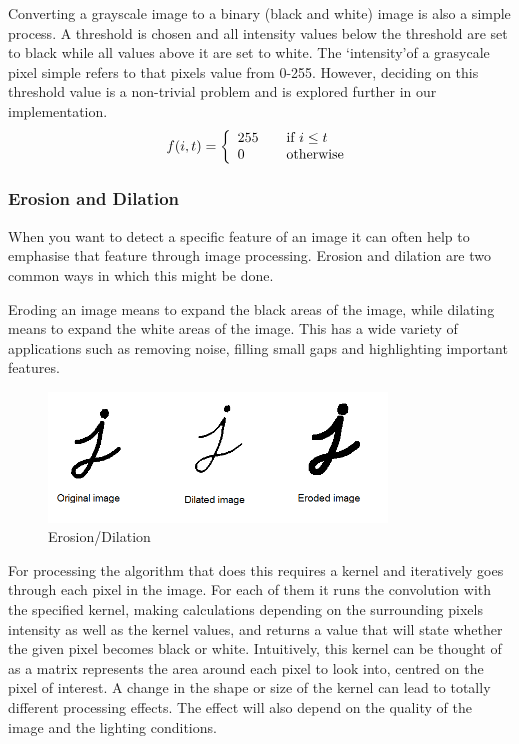 Converting a grayscale image to a binary (black and white) image is also a simple process. A threshold is chosen and all intensity values below the threshold are set to black while all values above it are set to white. The \lq intensity\rq of a grasycale pixel simple refers to that pixels value from 0-255. However, deciding on this threshold value is a non-trivial problem and is explored further in our implementation.   
\[ f(i,t) = \left\{ 
  \begin{array}{l l}
    255 & \quad \text{if } i \leq  t\\
    0   & \quad \text{otherwise}
  \end{array} \right.\]

        \subsubsection{Erosion and Dilation}

When you want to detect a specific feature of an image it can often help to emphasise that feature through image processing. Erosion and dilation are two common ways in which this might be done.

Eroding an image means to expand the black areas of the image, while dilating means to expand the white areas of the image. This has a wide variety of applications such as removing noise, filling small gaps and highlighting important features.
            \begin{figure}[ht!]
                \centering
                \includegraphics[width=90mm]{./assets/dilated.png}
                \caption{Erosion/Dilation}
                \label{image:dilationerosion}
            \end{figure}

For processing the algorithm that does this requires a kernel and iteratively goes through each pixel in the image. For each of them it runs the convolution with the specified kernel, making calculations depending on the surrounding pixels intensity as well as the kernel values, and returns a value that will state whether the given pixel becomes black or white. Intuitively, this kernel can be thought of as a matrix represents the area around each pixel to look into, centred on the pixel of interest. A change in the shape or size of the kernel can lead to totally different processing effects. The effect will also depend on the quality of the image and the lighting conditions.

